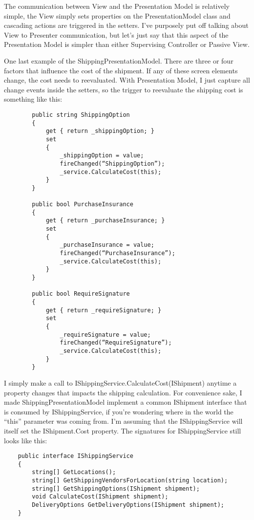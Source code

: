 \documentclass{article}
\begin{document}
{The communication between View and the Presentation Model is relatively simple, the View simply sets properties on the PresentationModel class and cascading actions are triggered in the setters.  I've purposely put off talking about View to Presenter communication, but let's just say that this aspect of the Presentation Model is simpler than either Supervising Controller or Passive View.

One last example of the ShippingPresentationModel.  There are three or four factors that influence the cost of the shipment.  If any of these screen elements change, the cost needs to reevaluated.  With Presentation Model, I just capture all change events inside the setters, so the trigger to reevaluate the shipping cost is something like this:
\begin{lstlisting}
        public string ShippingOption
        {
            get { return _shippingOption; }
            set
            {
                _shippingOption = value;
                fireChanged(“ShippingOption”);
                _service.CalculateCost(this);
            }
        } 

        public bool PurchaseInsurance
        {
            get { return _purchaseInsurance; }
            set
            {
                _purchaseInsurance = value;
                fireChanged(“PurchaseInsurance”);
                _service.CalculateCost(this);
            }
        }

        public bool RequireSignature
        {
            get { return _requireSignature; }
            set
            {
                _requireSignature = value;
                fireChanged(“RequireSignature”);
                _service.CalculateCost(this);
            }
        }
\end{lstlisting}
I simply make a call to IShippingService.CalculateCost(IShipment) anytime a property changes that impacts the shipping calculation.  For convenience sake, I made ShippingPresentationModel implement a common IShipment interface that is consumed by IShippingService, if you're wondering where in the world the “this” parameter was coming from.  I'm assuming that the IShippingService will itself set the IShipment.Cost property.  The signatures for IShippingService still looks like this:
\begin{lstlisting}
    public interface IShippingService
    {
        string[] GetLocations();
        string[] GetShippingVendorsForLocation(string location);
        string[] GetShippingOptions(IShipment shipment);
        void CalculateCost(IShipment shipment);
        DeliveryOptions GetDeliveryOptions(IShipment shipment);
    }
\end{lstlisting}

}
\end{document}
